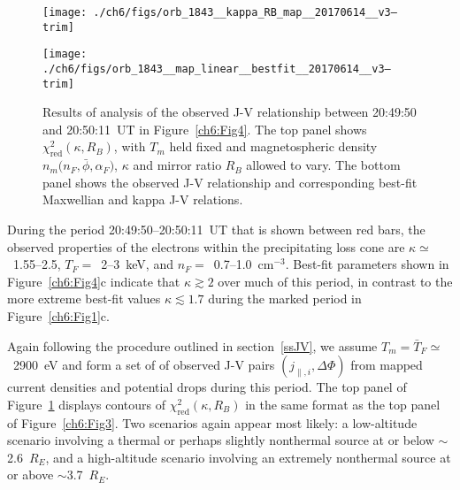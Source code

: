   \begin{figure}
    \centering

    \noindent\texttt{[image: ./ch6/figs/orb\_1843\_\_kappa\_RB\_map\_\_20170614\_\_v3--trim]}

    \vspace{1cm}

    \noindent\texttt{[image: ./ch6/figs/orb\_1843\_\_map\_linear\_\_bestfit\_\_20170614\_\_v3--trim]}




    \caption[Orbit 1843: Reduced chi-squared values for observed J-V
    relationship and corresponding best-fit J-V curves.]{Results of analysis of
      the observed J-V relationship between 20:49:50 and 20:50:11~UT in
      Figure~\ref{ch6:Fig4}. The top panel shows
      $\chi^2_{\mathrm{red}} ( \kappa, R_B)$, with $T_m$ held fixed and
      magnetospheric density $n_m \big ( n_F, \bar{\phi}, \alpha_F \big )$,
      $\kappa$ and mirror ratio $R_B$ allowed to vary. The bottom panel shows
      the observed J-V relationship and corresponding best-fit Maxwellian and
      kappa J-V relations.}
    \label{ch6:Fig6}
  \end{figure}

  
  During the period 20:49:50--20:50:11~UT that is shown between red bars, the
  observed properties of the electrons within the precipitating loss cone are
  $\kappa \simeq $~1.55--2.5, $T_F =$~2--3~keV, and $n_F =$~0.7--1.0~cm$^{-3}$.
  Best-fit parameters shown in Figure~\ref{ch6:Fig4}c indicate that
  $\kappa \gtrsim 2$ over much of this period, in contrast to the more extreme
  best-fit values $\kappa \lesssim 1.7$ during the marked period in
  Figure~\ref{ch6:Fig1}c.

  Again following the procedure outlined in section~\ref{ssJV}, we assume
  $T_m = \bar{T}_F \simeq$~2900~eV and form a set of of observed J-V pairs
  $( j_{\parallel,i} , \Delta \Phi )$ from mapped current densities and
  potential drops during this period. The top panel of Figure~\ref{ch6:Fig6}
  displays contours of $\chi^2_{\textrm{red}} ( \kappa, R_B )$ in the same
  format as the top panel of Figure~\ref{ch6:Fig3}. Two scenarios again appear
  most likely: a low-altitude scenario involving a thermal or perhaps slightly
  nonthermal source at or below $\sim$2.6~$R_E$, and a high-altitude scenario
  involving an extremely nonthermal source at or above $\sim$3.7~$R_E$.

